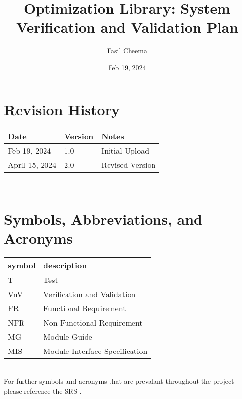 \documentclass[12pt, titlepage]{article}
\begin{document}
\title{Optimization Library: System Verification and Validation Plan} 

\author{Fasil Cheema}
\date{Feb 19, 2024}
	
\maketitle


\section*{Revision History}

\begin{tabularx}{\textwidth}{p{3cm}p{2cm}X}
\toprule {\bf Date} & {\bf Version} & {\bf Notes}\\
\midrule
Feb 19, 2024 & 1.0 & Initial Upload\\
April 15, 2024 & 2.0 & Revised Version\\
\bottomrule
\end{tabularx}

~\\


\newpage

\tableofcontents

\newpage

\section{Symbols, Abbreviations, and Acronyms}

\renewcommand{\arraystretch}{1.2}
\begin{tabular}{l l} 
  \toprule		
  \textbf{symbol} & \textbf{description}\\
  \midrule 
  T & Test\\
  VnV & Verification and Validation\\
  FR & Functional Requirement\\
  NFR & Non-Functional Requirement\\
  MG & Module Guide\\
  MIS & Module Interface Specification\\
  \bottomrule
\end{tabular}\\
For further symbols and acronyms that are prevalant
throughout the project please reference the SRS \citep{SRS}.

\newpage

\end{document}

